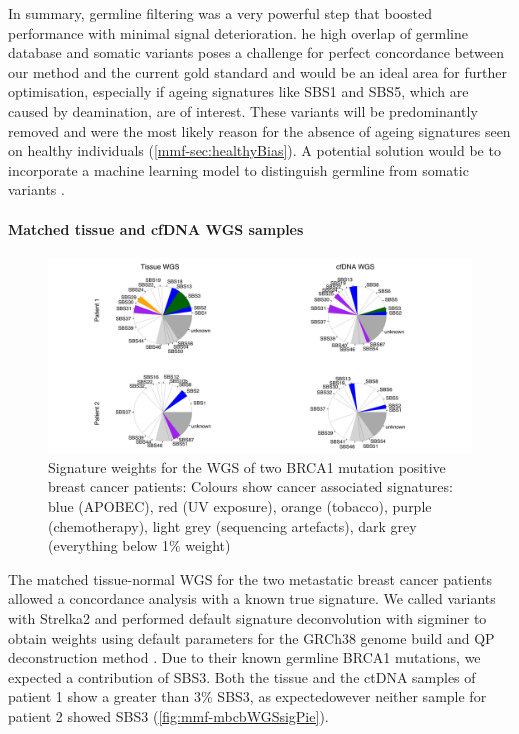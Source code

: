 In summary,  germline filtering was a very powerful step that  boosted  performance  with minimal signal deterioration. he high overlap of germline database  and somatic variants poses a challenge for perfect concordance between our method and the current gold standard and would be an ideal area for further optimisation, especially if ageing signatures like SBS1 and SBS5, which are caused by deamination, are of interest. These variants will be predominantly removed and were the most likely reason for the absence of ageing signatures seen on healthy individuals (\autoref{mmf-sec:healthyBias}). A potential solution would be to incorporate a machine learning model to distinguish germline from somatic variants \cite{Spinella2016,Sahraeian2022}.

\paragraph{Matched tissue and cfDNA WGS samples}
\label{mmf-sec:matchedMBCB}

\begin{figure}[ht]
\centering
\includegraphics[width=.99\linewidth]{Figures/MisMatchFinder/mbcbWGSsignatures.pdf}
\caption[Signature weights for the WGS of two BRCA1 mutation positive breast cancer patients]{Signature weights for the WGS of two BRCA1 mutation positive breast cancer patients: Colours show cancer associated signatures: blue (APOBEC), red (UV exposure), orange (tobacco), purple (chemotherapy), light grey (sequencing artefacts), dark grey (everything below 1\% weight)}\label{fig:mmf-mbcbWGSsigPie}
\end{figure}
 
The matched tissue-normal WGS for the two metastatic breast cancer patients allowed a concordance analysis with a known true signature. We called variants with Strelka2 and performed default signature deconvolution with sigminer to obtain weights using default parameters for the GRCh38 genome build and QP deconstruction method  \cite{Wang2021}. Due to their known germline BRCA1 mutations, we expected a contribution of SBS3. Both the tissue and the ctDNA samples of patient 1 show a greater than 3\% SBS3, as expectedowever neither sample for patient 2 showed SBS3 (\autoref{fig:mmf-mbcbWGSsigPie}).
 
